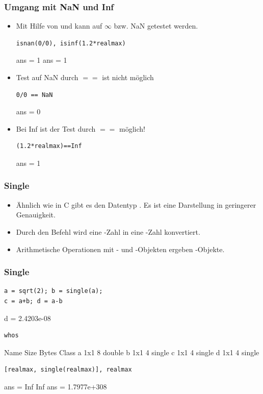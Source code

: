 \documentclass[hyperref={xetex}]{beamer}
\begin{document}
\begin{frame}[fragile]\frametitle{Umgang mit NaN und       Inf  }
\begin{itemize}
\item Mit Hilfe von \alert{ } und \alert{ } kann auf
$\infty$ bzw. NaN getestet werden.
 \begin{lstlisting}
isnan(0/0), isinf(1.2*realmax)
\end{lstlisting}
\begin{matlab}
ans =   1  ans =   1
\end{matlab}
\item Test auf NaN durch $==$ ist nicht m\"oglich
\begin{lstlisting}
0/0 == NaN
\end{lstlisting}
\begin{matlab}
ans =     0
\end{matlab}
\item Bei Inf ist der Test durch $==$  m\"oglich!
\begin{lstlisting}
(1.2*realmax)==Inf
\end{lstlisting}
\begin{matlab}
ans =     1
\end{matlab}
\end{itemize}
\end{frame}
%
%
\begin{frame}[fragile]\frametitle{Single}
\begin{itemize}
\item \"Ahnlich wie in C gibt es den Datentyp . Es ist eine
Darstellung in geringerer Genauigkeit. 
\item Durch den Befehl \alert{ } wird eine -Zahl in
eine -Zahl konvertiert. 
\item Arithmetische Operationen mit - und -Objekten
ergeben  -Objekte.
\end{itemize}
\end{frame}
%
%
\begin{frame}[fragile]\frametitle{Single}
\begin{lstlisting}
a = sqrt(2); b = single(a);
c = a+b; d = a-b
\end{lstlisting}
\begin{matlab}
d =
  2.4203e-08
\end{matlab}
\begin{lstlisting}
whos
\end{lstlisting}
\begin{matlab}
  Name   Size     Bytes  Class    
  a      1x1        8  double              
  b      1x1        4  single              
  c      1x1        4  single              
  d      1x1        4  single  
\end{matlab}
\begin{lstlisting}
[realmax, single(realmax)], realmax
\end{lstlisting}
\begin{matlab}
ans =
   Inf   Inf
ans =
  1.7977e+308
\end{matlab}
\end{frame}
\end{document}

